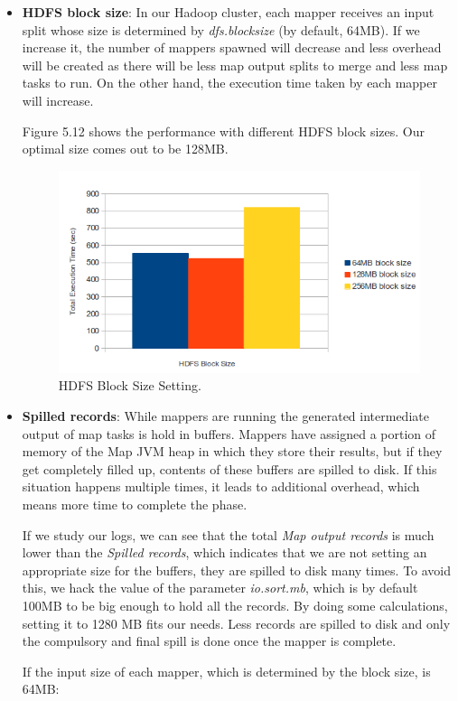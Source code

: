 \begin{itemize}
\item \textbf{HDFS block size}: In our Hadoop cluster, each mapper receives an input split whose size is determined by \textit{dfs.blocksize} (by default, 64MB). If we increase it, the number of mappers spawned will decrease and less overhead will be created as there will be less map output splits to merge and less map tasks to run. On the other hand, the execution time taken by each mapper will increase. 
\par
Figure 5.12 shows the performance with different HDFS block sizes. Our optimal size comes out to be 128MB.

\begin{figure}[htb]
\centering
\includegraphics[width=1\textwidth]{./images/HDFSBlockSize.png}
\caption{HDFS Block Size Setting.} \label{fig:HDFSBlockSize}
\end{figure}




\item \textbf{Spilled records}: While mappers are running the generated intermediate output of map tasks is hold in buffers. Mappers have assigned a portion of memory of the Map JVM heap in which they store their results, but if they get completely filled up, contents of these buffers are spilled to disk. If this situation happens multiple times, it leads to additional overhead, which means more time to complete the phase. 
\par
If we study our logs, we can see that the total \textit{Map output records} is much lower than the \textit{Spilled records}, which indicates that we are not setting an appropriate size for the buffers, they are spilled to disk many times. To avoid this, we hack the value of the parameter \textit{io.sort.mb}, which is by default 100MB to be big enough to hold all the records. By doing some calculations, setting it to 1280 MB fits our needs. Less records are spilled to disk and only the compulsory and final spill is done once the mapper is complete.
\par
If the input size of each mapper, which is determined by the block size, is 64MB:
\bigskip


\end{itemize}
